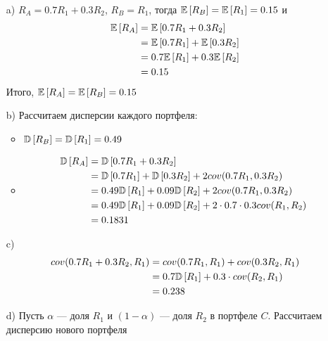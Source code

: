 \documentclass{article}
\begin{document}
\begin{enumerate}
    \item[a)] $R_A=0.7R_1+0.3R_2$, $R_B=R_1$, тогда $\mathbb{E}\left[R_B\right]=\mathbb{E}\left[R_1\right]=0.15$ и  
    \begin{equation*}
        \begin{aligned}
            \mathbb{E}\left[R_A\right]&=\mathbb{E}\left[0.7R_1+0.3R_2\right]\\
            &=\mathbb{E}\left[0.7R_1\right]+\mathbb{E}\left[0.3R_2\right]\\
            &=0.7\mathbb{E}\left[R_1\right]+0.3\mathbb{E}\left[R_2\right]\\
            &=0.15
        \end{aligned}
    \end{equation*}
    Итого, $\mathbb{E}\left[R_A\right]=\mathbb{E}\left[R_B\right]=0.15$

    \item[b)] Рассчитаем дисперсии каждого портфеля:
    \begin{itemize}
        \item $\mathbb{D}\left[R_B\right]=\mathbb{D}\left[R_1\right]=0.49$
        \item \begin{equation*}
            \begin{aligned}
                \mathbb{D}\left[R_A\right]&=\mathbb{D}\left[0.7R_1+0.3R_2\right]\\
                &=\mathbb{D}\left[0.7R_1\right]+\mathbb{D}\left[0.3R_2\right]+2cov(0.7R_1,0.3R_2)\\
                &=0.49\mathbb{D}\left[R_1\right]+0.09\mathbb{D}\left[R_2\right]+2cov(0.7R_1,0.3R_2)\\
                &=0.49\mathbb{D}\left[R_1\right]+0.09\mathbb{D}\left[R_2\right]+2\cdot0.7\cdot0.3cov(R_1,R_2)\\
                &=0.1831
            \end{aligned}
        \end{equation*}
    \end{itemize}

    \item[c)] \begin{equation*}
        \begin{aligned}
            cov(0.7R_1+0.3R_2,R_1)&=cov(0.7R_1,R_1)+cov(0.3R_2,R_1)\\
            &=0.7\mathbb{D}\left[R_1\right]+0.3\cdot cov(R_2,R_1)\\
            &=0.238
        \end{aligned}
    \end{equation*}

    \item[d)] Пусть $\alpha$ — доля $R_1$ и $(1-\alpha)$ — доля $R_2$ в портфеле $C$. Рассчитаем дисперсию нового портфеля


\end{enumerate}
\end{document}
